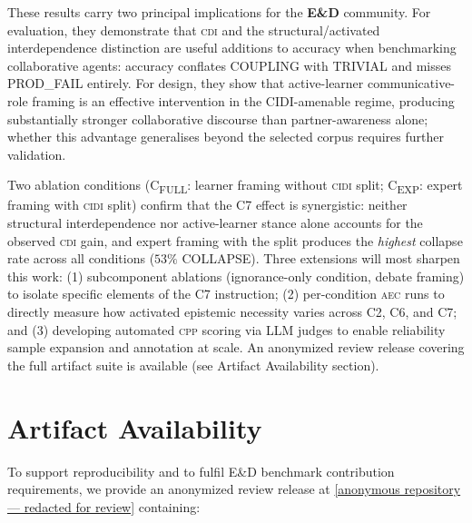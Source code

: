 \documentclass{article}
\newcommand{\CDI}{\textsc{cdi}}
\newcommand{\CPP}{\textsc{cpp}}
\newcommand{\CIDI}{\textsc{cidi}}
\newcommand{\AEC}{\textsc{aec}}
\begin{document}
These results carry two principal implications for the \textbf{E\&D}
community. For evaluation, they demonstrate that \CDI{} and the
structural/activated interdependence distinction are useful additions
to accuracy when benchmarking collaborative agents: accuracy conflates
COUPLING with TRIVIAL and misses PROD\_FAIL entirely. For design, they
show that active-learner communicative-role framing is an effective
intervention in the CIDI-amenable regime, producing substantially
stronger collaborative discourse than partner-awareness alone; whether
this advantage generalises beyond the selected corpus requires further
validation.

Two ablation conditions (C\textsubscript{FULL}: learner framing without
\CIDI{} split; C\textsubscript{EXP}: expert framing with \CIDI{} split)
confirm that the C7 effect is synergistic: neither structural
interdependence nor active-learner stance alone accounts for the
observed \CDI{} gain, and expert framing with the split produces the
\emph{highest} collapse rate across all conditions ($53\%$ COLLAPSE).
Three extensions will most sharpen this work: (1) subcomponent ablations
(ignorance-only condition, debate framing) to isolate specific elements
of the C7 instruction; (2) per-condition \AEC{} runs to directly measure
how activated epistemic necessity varies across C2, C6, and C7; and (3)
developing automated \CPP{} scoring via LLM judges to enable reliability
sample expansion and annotation at scale. An anonymized review release covering the
full artifact suite is available (see Artifact Availability section).

\section*{Artifact Availability}
\label{sec:artifacts}

To support reproducibility and to fulfil E\&D benchmark contribution
requirements, we provide an anonymized review release at
\url{[anonymous repository — redacted for review]} containing:
\end{document}
